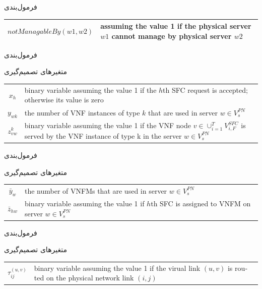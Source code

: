 \documentclass{beamer}
\begin{document}
\begin{persian}
\begin{frame}{فرمول‌بندی}
\begin{center}
\begin{latin}
\begin{tabular}{|c|p{5cm}|}
        \hline
        \(notManagableBy(w1, w2)\) & assuming the value 1 if the physical server \(w1\) cannot manage by physical server \(w2\) \\
        \hline
    \end{tabular}\end{latin}\end{center}
\end{frame}
\begin{frame}{فرمول‌بندی}
    \par
    متغیرهای تصمیم‌گیری
    \begin{latin}\begin{tabular}{c p{10cm}}
        $x_h$ & binary variable assuming the value 1 if the $h$th SFC request is accepted; otherwise its value is zero \\
        $y_{wk}$ & the number of VNF instances of type $k$ that are used in server $w \in V_s^{PN}$ \\
        $z^k_{vw}$ & binary variable assuming the value 1 if the VNF node $v \in \cup_{i=1}^{T} V_{i, F}^{SFC}$ is served by the VNF instance of type k in the server $w \in V_s^{PN}$ \\
    \end{tabular}\end{latin}
\end{frame}
\begin{frame}{فرمول‌بندی}
    \par
    متغیرهای تصمیم‌گیری
    \begin{latin}\begin{tabular}{c p{10cm}}
        $\bar{y}_w$ & the number of VNFMs that are used in server $w \in V_s^{PN}$\\
        $\bar{z}_{hw}$ & binary variable assuming the value 1 if $h$th SFC is assigned to VNFM on server $w \in V_s^{PN}$\\
    \end{tabular}\end{latin}
\end{frame}
\begin{frame}{فرمول‌بندی}
    \par
    متغیرهای تصمیم‌گیری
    \begin{latin}\begin{tabular}{c p{10cm}}
        $\tau^{(u,v)}_{ij}$ & binary variable assuming the value 1 if the virual link $(u,v)$ is routed on the physical network link $(i,j)$\\

\end{tabular}
\end{latin}
\end{frame}
\end{persian}
\end{document}

